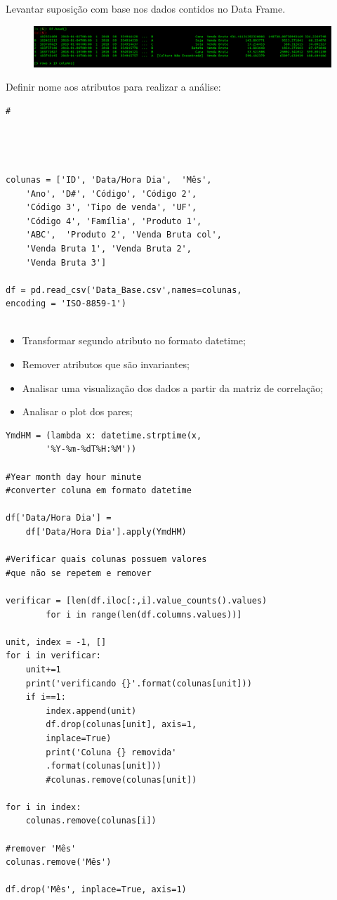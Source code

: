 \documentclass[compress]{beamer}
\begin{document}
Levantar suposição com base nos dados contidos no Data Frame.

\begin{frame}{}
\begin{figure}[h!]
    \centering
    \includegraphics[scale=.2]{img/dfhead.png}
\end{figure}

Definir nome aos atributos para realizar a análise:
\end{frame}

\begin{verbatim}
#




colunas = ['ID', 'Data/Hora Dia',  'Mês',
    'Ano', 'D#', 'Código', 'Código 2',
    'Código 3', 'Tipo de venda', 'UF',
    'Código 4', 'Família', 'Produto 1',
    'ABC',  'Produto 2', 'Venda Bruta col',
    'Venda Bruta 1', 'Venda Bruta 2',
    'Venda Bruta 3']
    
df = pd.read_csv('Data_Base.csv',names=colunas,
encoding = 'ISO-8859-1')    
    
\end{verbatim}

\begin{frame}{}

    \begin{itemize}
        \item Transformar segundo atributo no formato datetime;
        \item Remover atributos que são invariantes;
        \item Analisar uma visualização dos dados a partir da matriz de correlação;
        \item Analisar o plot dos pares;
    \end{itemize}
\end{frame}

\begin{verbatim}
YmdHM = (lambda x: datetime.strptime(x,
        '%Y-%m-%dT%H:%M'))

#Year month day hour minute
#converter coluna em formato datetime

df['Data/Hora Dia'] =
    df['Data/Hora Dia'].apply(YmdHM)

#Verificar quais colunas possuem valores
#que não se repetem e remover

verificar = [len(df.iloc[:,i].value_counts().values)
        for i in range(len(df.columns.values))]

unit, index = -1, []
for i in verificar: 
	unit+=1 
	print('verificando {}'.format(colunas[unit]))
	if i==1:
		index.append(unit)
		df.drop(colunas[unit], axis=1,
		inplace=True)
		print('Coluna {} removida'
		.format(colunas[unit]))
		#colunas.remove(colunas[unit])

for i in index:
	colunas.remove(colunas[i])

#remover 'Mês'
colunas.remove('Mês')

df.drop('Mês', inplace=True, axis=1)
\end{verbatim}
\end{document}
